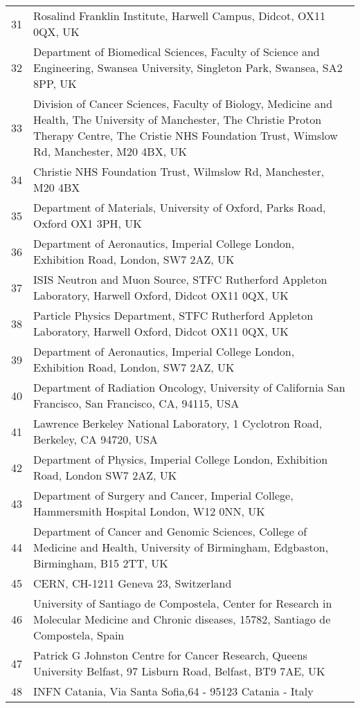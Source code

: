 {\begin{tabular}{ c p{15cm} }
     31 & Rosalind Franklin Institute, Harwell Campus, Didcot, OX11 0QX, UK\\
     32 & Department of Biomedical Sciences, Faculty of Science and Engineering, Swansea University, Singleton Park, Swansea, SA2 8PP, UK\\
     33 & Division of Cancer Sciences, Faculty of Biology, Medicine and Health, The University of Manchester, The Christie Proton Therapy Centre, The Cristie NHS Foundation Trust, Wimslow Rd, Manchester, M20 4BX, UK\\
     34 & Christie NHS Foundation Trust, Wilmslow Rd, Manchester, M20 4BX\\
     35 & Department of Materials, University of Oxford, Parks Road, Oxford OX1 3PH, UK\\
     36 & Department of Aeronautics, Imperial College London, Exhibition Road, London, SW7 2AZ, UK\\
     37 & ISIS Neutron and Muon Source, STFC Rutherford Appleton Laboratory, Harwell Oxford, Didcot OX11 0QX, UK\\
     38 & Particle Physics Department, STFC Rutherford Appleton Laboratory, Harwell Oxford, Didcot OX11 0QX, UK\\
     39 & Department of Aeronautics, Imperial College London, Exhibition Road, London, SW7 2AZ, UK\\
     40 & Department of Radiation Oncology, University of California San Francisco, San Francisco, CA, 94115, USA\\
     41 & Lawrence Berkeley National Laboratory, 1 Cyclotron Road, Berkeley, CA 94720, USA\\
     42 & Department of Physics, Imperial College London, Exhibition Road, London SW7 2AZ, UK\\
     43 & Department of Surgery and Cancer, Imperial College, Hammersmith Hospital London, W12 0NN, UK\\
     44 & Department of Cancer and Genomic Sciences, College of Medicine and Health, University of Birmingham, Edgbaston, Birmingham, B15 2TT, UK\\
     45 & CERN, CH-1211 Geneva 23, Switzerland\\
     46 & University of Santiago de Compostela, Center for Research in Molecular Medicine and Chronic diseases, 15782, Santiago de Compostela, Spain\\
     47 & Patrick G Johnston Centre for Cancer Research, Queens University Belfast, 97 Lisburn Road, Belfast, BT9 7AE, UK\\
     48 & INFN Catania, Via Santa Sofia,64 - 95123 Catania - Italy\\

\end{tabular}}
